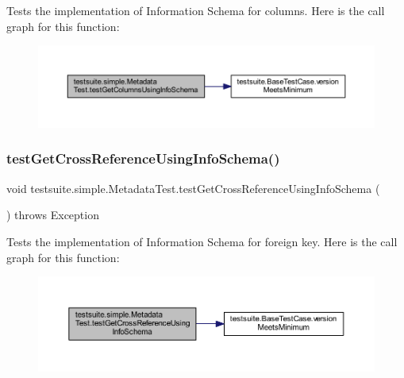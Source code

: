 Tests the implementation of Information Schema for columns. Here is the call graph for this function\+:
\nopagebreak
\begin{figure}[H]
\begin{center}
\leavevmode
\includegraphics[width=350pt]{classtestsuite_1_1simple_1_1_metadata_test_a96ed59d14490afb4e9e39aa8414acd0a_cgraph}
\end{center}
\end{figure}
\mbox{\label{classtestsuite_1_1simple_1_1_metadata_test_a5c35cdbd777234219930a906ee096e93}} 
\subsubsection{\texorpdfstring{test\+Get\+Cross\+Reference\+Using\+Info\+Schema()}{testGetCrossReferenceUsingInfoSchema()}}
{\footnotesize\ttfamily void testsuite.\+simple.\+Metadata\+Test.\+test\+Get\+Cross\+Reference\+Using\+Info\+Schema (\begin{DoxyParamCaption}{ }\end{DoxyParamCaption}) throws Exception}

Tests the implementation of Information Schema for foreign key. Here is the call graph for this function\+:
\nopagebreak
\begin{figure}[H]
\begin{center}
\leavevmode
\includegraphics[width=350pt]{classtestsuite_1_1simple_1_1_metadata_test_a5c35cdbd777234219930a906ee096e93_cgraph}
\end{center}
\end{figure}
\mbox{\label{classtestsuite_1_1simple_1_1_metadata_test_ae23d4ce9f6bff53b3ea3033d6a7f82a7}} 
